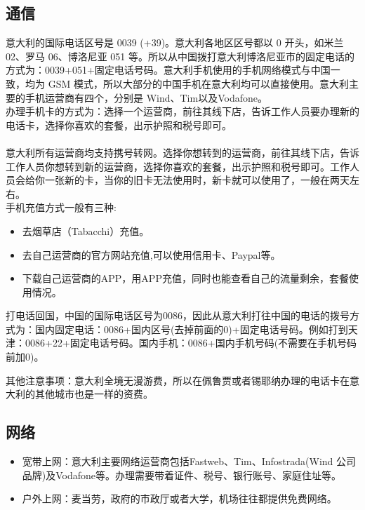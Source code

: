 \subsection{通信}
意大利的国际电话区号是 0039 (+39)。意大利各地区区号都以 0 开头，如米兰 02、罗马 06、博洛尼亚 051 等。所以从中国拨打意大利博洛尼亚市的固定电话的方式为：0039+051+固定电话号码。意大利手机使用的手机网络模式与中国一致，均为 GSM 模式，所以大部分的中国手机在意大利均可以直接使用。意大利主要的手机运营商有四个，分别是 Wind、Tim以及Vodafone。 \\
办理手机卡的方式为：选择一个运营商，前往其线下店，告诉工作人员要办理新的电话卡，选择你喜欢的套餐，出示护照和税号即可。\\
\\
意大利所有运营商均支持携号转网。选择你想转到的运营商，前往其线下店，告诉工作人员你想转到新的运营商，选择你喜欢的套餐，出示护照和税号即可。工作人员会给你一张新的卡，当你的旧卡无法使用时，新卡就可以使用了，一般在两天左右。\\



手机充值方式一般有三种:
\begin{itemize}
\item 去烟草店（Tabacchi）充值。 
\item 去自己运营商的官方网站充值,可以使用信用卡、Paypal等。 
\item 下载自己运营商的APP，用APP充值，同时也能查看自己的流量剩余，套餐使用情况。
\end{itemize}
打电话回国，中国的国际电话区号为0086，因此从意大利打往中国的电话的拨号方式为：国内固定电话：0086+国内区号(去掉前面的0)+固定电话号码。例如打到天津：0086+22+固定电话号码。国内手机：0086+国内手机号码(不需要在手机号码前加0)。

其他注意事项：意大利全境无漫游费，所以在佩鲁贾或者锡耶纳办理的电话卡在意大利的其他城市也是一样的资费。 
\subsection{网络}

\begin{itemize}
\item 宽带上网：意大利主要网络运营商包括Fastweb、Tim、Infostrada(Wind 公司品牌)及Vodafone等。办理需要带着证件、税号、银行账号、家庭住址等。
\item 户外上网：麦当劳，政府的市政厅或者大学，机场往往都提供免费网络。
\end{itemize}

